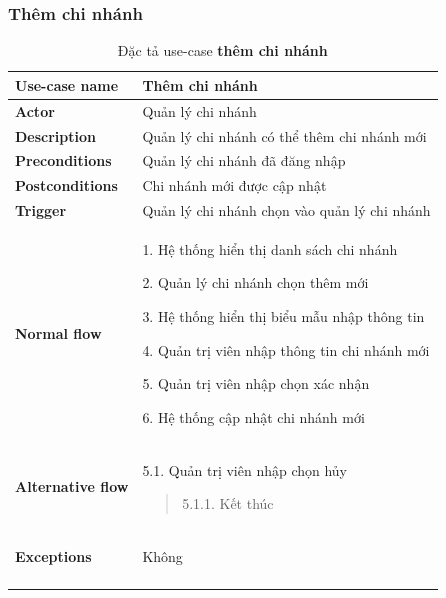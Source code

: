 \subsubsection{Thêm chi nhánh}
{
    \setlength\extrarowheight{6pt}
    \begin{longtable}{| p{} | p{} |}
        \hline
        \textbf{Use-case name}
         &
        Thêm chi nhánh
        \\
        \hline
        \textbf{Actor}
         &
        Quản lý chi nhánh
        \\
        \hline
        \textbf{Description}
         &
        Quản lý chi nhánh có thể thêm chi nhánh mới
        \\
        \hline
        \textbf{Preconditions}
         &
        Quản lý chi nhánh đã đăng nhập
        \\
        \hline
        \textbf{Postconditions}
         &
        Chi nhánh mới được cập nhật
        \\
        \hline
        \textbf{Trigger}
         &
        Quản lý chi nhánh chọn vào quản lý chi nhánh
        \\
        \hline
        \begin{flushleft}
            \textbf{Normal flow}
        \end{flushleft}
         &
        1. Hệ thống hiển thị danh sách chi nhánh

        2. Quản lý chi nhánh chọn thêm mới

        3. Hệ thống hiển thị biểu mẫu nhập thông tin

        4. Quản trị viên nhập thông tin chi nhánh mới

        5. Quản trị viên nhập chọn xác nhận

        6. Hệ thống cập nhật chi nhánh mới
        \\
        \hline
        \begin{flushleft}
            \textbf{Alternative flow}
        \end{flushleft}
         &
        5.1. Quản trị viên nhập chọn hủy
        \begin{quote}
            5.1.1. Kết thúc
        \end{quote}
        \\
        \hline
        \begin{flushleft}
            \textbf{Exceptions}
        \end{flushleft}
         &
        Không
        \\
        \hline
        \caption{Đặc tả use-case \textbf{thêm chi nhánh}}
    \end{longtable}
}
